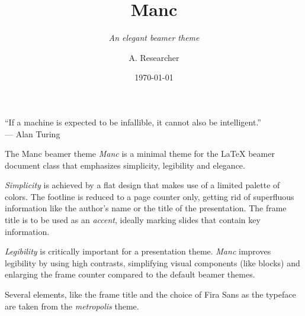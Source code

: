 \documentclass[compress,aspectratio=1610]{beamer}
\title{Manc}
\subtitle{\textit{An elegant beamer theme}}
\date{\today}
\author{A. Researcher}
\institute{\texttt{mymail@myuniversity.edu}}
\begin{document}
\begin{frame}
  \titlepage
\end{frame}

\begin{frame}
  \centering
  \begin{tcolorbox}[
    before skip=10mm,
    after skip=10mm,
    boxrule=2pt,
    sharp corners,
    fonttitle=\usebeamerfont{block title},
    fontupper=\usebeamerfont{block body},
    fontlower=\usebeamerfont{block body},
    boxsep=.5mm,
    parbox=false,
    width=26em,
  ]
    \enquote{If a machine is expected to be infallible, it cannot also be intelligent.}\\
    \hfill \textup{— Alan Turing}
  \end{tcolorbox}
\end{frame}

\begin{frame}{The Manc beamer theme}
  \emph{Manc} is a minimal theme for the \LaTeX{} beamer document class that emphasizes simplicity, legibility and elegance.

  \emph{Simplicity} is achieved by a flat design that makes use of a limited palette of colors. The footline is reduced to a page counter only, getting rid of superfluous information like the author's name or the title of the presentation.
  The frame title is to be used as an \emph{accent}, ideally marking slides that contain key information.

  \emph{Legibility} is critically important for a presentation theme.
  \emph{Manc} improves legibility by using high contrasts, simplifying visual components (like blocks) and enlarging the frame counter compared to the default beamer themes.

  Several elements, like the frame title and the choice of Fira Sans as the typeface are taken from the \emph{metropolis} theme.
\end{frame}
\end{document}
